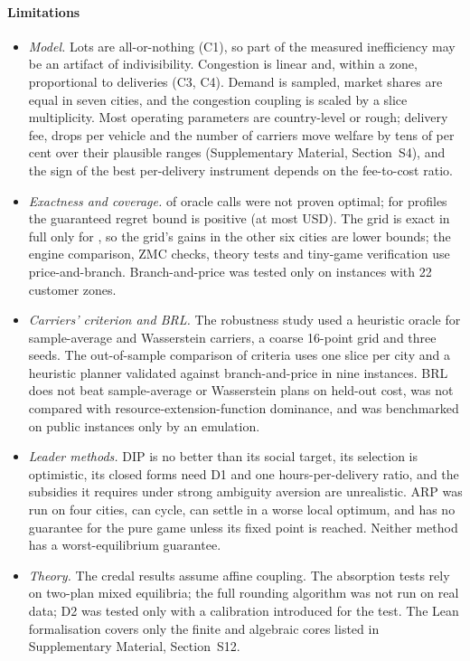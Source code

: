 \documentclass[preprint,11pt]{elsarticle}
\theoremstyle{definition}
\theoremstyle{remark}
\newcommand{\SM}[1]{Supplementary Material, Section~#1}
\begin{document}
\paragraph{Limitations}
\begin{itemize}[leftmargin=*,itemsep=0pt]
\item \emph{Model.} Lots are all-or-nothing (C1), so part of the measured inefficiency may be an artifact of indivisibility. Congestion is linear and, within a zone, proportional to deliveries (C3, C4). Demand is sampled, market shares are equal in seven cities, and the congestion coupling is scaled by a slice multiplicity. Most operating parameters are country-level or rough; delivery fee, drops per vehicle and the number of carriers move welfare by tens of per cent over their plausible ranges (\SM{S4}), and the sign of the best per-delivery instrument depends on the fee-to-cost ratio.
\item \emph{Exactness and coverage.} \ExUnproven{} of \ExCalls{} oracle calls were not proven optimal; for \ExBoundN{} profiles the guaranteed regret bound is positive (at most \ExBoundMax{} USD). The grid is exact in full only for \ExEtwoFullCities, so the grid's gains in the other six cities are lower bounds; the engine comparison, ZMC checks, theory tests and tiny-game verification use price-and-branch. Branch-and-price was tested only on instances with 22 customer zones.
\item \emph{Carriers' criterion and BRL.} The robustness study used a heuristic oracle for sample-average and Wasserstein carriers, a coarse 16-point grid and three seeds. The out-of-sample comparison of criteria uses one slice per city and a heuristic planner validated against branch-and-price in nine instances. BRL does not beat sample-average or Wasserstein plans on held-out cost, was not compared with resource-extension-function dominance, and was benchmarked on public instances only by an emulation.
\item \emph{Leader methods.} DIP is no better than its social target, its selection is optimistic, its closed forms need D1 and one hours-per-delivery ratio, and the subsidies it requires under strong ambiguity aversion are unrealistic. ARP was run on four cities, can cycle, can settle in a worse local optimum, and has no guarantee for the pure game unless its fixed point is reached. Neither method has a worst-equilibrium guarantee.
\item \emph{Theory.} The credal results assume affine coupling. The absorption tests rely on two-plan mixed equilibria; the full rounding algorithm was not run on real data; D2 was tested only with a calibration introduced for the test. The Lean formalisation covers only the finite and algebraic cores listed in \SM{S12}.

\end{itemize}
\end{document}
